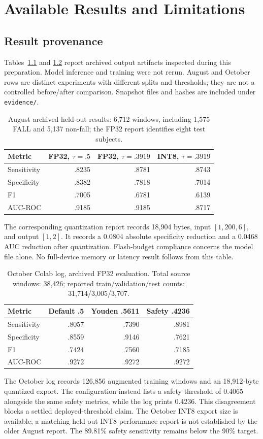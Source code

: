 \chapter{Available Results and Limitations}
\section{Result provenance}
Tables~\ref{tab:august} and \ref{tab:october} report archived output artifacts inspected during this preparation. Model inference and training were not rerun. August and October rows are distinct experiments with different splits and thresholds; they are not a controlled before/after comparison. Snapshot files and hashes are included under \texttt{evidence/}.

\begin{table}[htbp]
\centering\caption{August archived held-out results: 6,712 windows, including 1,575 FALL and 5,137 non-fall; the FP32 report identifies eight test subjects.}
\label{tab:august}
\begin{tabular}{@{}lrrr@{}}\toprule
Metric & FP32, $\tau=.5$ & FP32, $\tau=.3919$ & INT8, $\tau=.3919$\\\midrule
Sensitivity & .8235 & .8781 & .8743\\
Specificity & .8382 & .7818 & .7014\\
F1 & .7005 & .6781 & .6139\\
AUC-ROC & .9185 & .9185 & .8717\\\bottomrule
\end{tabular}
\end{table}
The corresponding quantization report records 18,904 bytes, input $[1,200,6]$, and output $[1,2]$. It records a 0.0804 absolute specificity reduction and a 0.0468 AUC reduction after quantization. Flash-budget compliance concerns the model file alone. No full-device memory or latency result follows from this table.

\begin{table}[htbp]
\centering\caption{October Colab log, archived FP32 evaluation. Total source windows: 38,426; reported train/validation/test counts: 31,714/3,005/3,707.}
\label{tab:october}
\begin{tabular}{@{}lrrr@{}}\toprule
Metric & Default .5 & Youden .5611 & Safety .4236\\\midrule
Sensitivity & .8057 & .7390 & .8981\\
Specificity & .8559 & .9146 & .7621\\
F1 & .7424 & .7560 & .7185\\
AUC-ROC & .9272 & .9272 & .9272\\\bottomrule
\end{tabular}
\end{table}
The October log records 126,856 augmented training windows and an 18,912-byte quantized export. The configuration instead lists a safety threshold of 0.4065 alongside the same safety metrics, while the log prints 0.4236. This disagreement blocks a settled deployed-threshold claim. The October INT8 export size is available; a matching held-out INT8 performance report is not established by the older August report. The 89.81\% safety sensitivity remains below the 90\% target.

